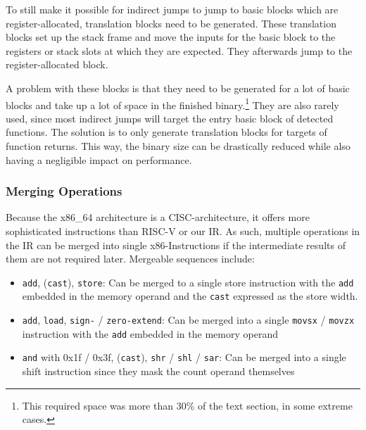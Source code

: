\documentclass[course=eragp]{aspdoc}
\begin{document}
\par

To still make it possible for indirect jumps to jump to basic blocks which are register-allocated,
translation blocks need to be generated.
These translation blocks set up the stack frame and move the inputs for the basic block to the
registers or stack slots at which they are expected.
They afterwards jump to the register-allocated block.

\par

A problem with these blocks is that they need to be generated for a lot of basic blocks and take up
a lot of space in the finished binary.\footnote{This required space was more than 30\% of the
\.text section, in some extreme cases.}
They are also rarely used, since most indirect jumps will target the entry basic block of detected
functions.
The solution is to only generate translation blocks for targets of function returns. This way, the binary size can be
drastically reduced while also having a negligible impact on performance.

\subsubsection{Merging Operations}
Because the x86\_64 architecture is a CISC-architecture, it offers more sophisticated
instructions than RISC-V or our IR. As such, multiple operations in the IR can be merged
into single x86-Instructions if the intermediate results of them are not required later.
Mergeable sequences include:
\begin{itemize}
\item \texttt{add}, (\texttt{cast}), \texttt{store}: Can be merged to a single store instruction with the
\texttt{add} embedded in the memory operand and the \texttt{cast} expressed as the store width.
    \item \texttt{add}, \texttt{load}, \texttt{sign-} / \texttt{zero-extend}: Can be merged into a
    single \texttt{movsx} / \texttt{movzx} instruction with the \texttt{add} embedded in the memory operand
\item \texttt{and} with 0x1f / 0x3f, (\texttt{cast}), \texttt{shr} / \texttt{shl} / \texttt{sar}:
    Can be merged into a single shift instruction since they mask the count operand themselves
\end{itemize}
\end{document}
